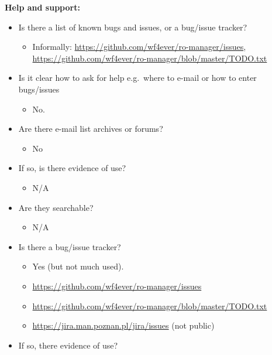 \textbf{Help and support:}

\begin{itemize}
\itemsep1pt\parskip0pt
\item
  Is there a list of known bugs and issues, or a bug/issue tracker?

  \begin{itemize}
  \itemsep1pt\parskip0pt
  \item
    Informally: \url{https://github.com/wf4ever/ro-manager/issues},
    \url{https://github.com/wf4ever/ro-manager/blob/master/TODO.txt}
  \end{itemize}
\item
  Is it clear how to ask for help e.g.~where to e-mail or how to enter
  bugs/issues

  \begin{itemize}
  \itemsep1pt\parskip0pt
  \item
    No.
  \end{itemize}
\item
  Are there e-mail list archives or forums?

  \begin{itemize}
  \itemsep1pt\parskip0pt
  \item
    No
  \end{itemize}
\item
  If so, is there evidence of use?

  \begin{itemize}
  \itemsep1pt\parskip0pt
  \item
    N/A
  \end{itemize}
\item
  Are they searchable?

  \begin{itemize}
  \itemsep1pt\parskip0pt
  \item
    N/A
  \end{itemize}
\item
  Is there a bug/issue tracker?

  \begin{itemize}
  \itemsep1pt\parskip0pt
  \item
    Yes (but not much used).
  \item
    \url{https://github.com/wf4ever/ro-manager/issues}
  \item
    \url{https://github.com/wf4ever/ro-manager/blob/master/TODO.txt}
  \item
    \url{https://jira.man.poznan.pl/jira/issues} (not public)
  \end{itemize}
\item
  If so, there evidence of use?


\end{itemize}
